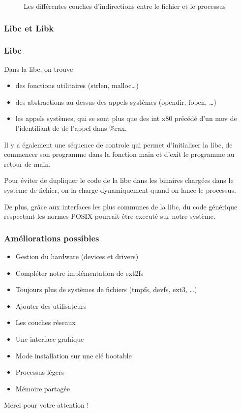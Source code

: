 \documentclass[10pt,a4paper]{beamer}
\begin{document}
\begin{frame}
  \begin{figure}
    \caption{Les différentes couches d'indirections entre le fichier et le processus}
  \end{figure}
\end{frame}

\begin{frame}
  \frametitle{Libc et Libk}

\end{frame}

\begin{frame}
  \frametitle{Libc}
  Dans la libc, on trouve
  \begin{itemize}
  \item des fonctions utilitaires (\textrm{strlen}, \textrm{malloc}\ldots)
  \item des abstractions au dessus des appels systèmes (\textrm{opendir}, \textrm{fopen}, \ldots)
  \item les appels systèmes, qui se sont plus que des \textrm{int x80} précédé d'un \textrm{mov} de l'identifiant de de l'appel dans \textrm{\%rax}.
  \end{itemize}

  Il y a également une séquence de controle qui permet d'initialiser la libc, de commencer son programme dans la fonction \textrm{main} et d'\textrm{exit} le programme au retour  de \textrm{main}.

  Pour éviter de dupliquer le code de la libc dans les binaires chargées dans le système de fichier, on la charge dynamiquement quand on lance le processus.

  De plus, grâce aux interfaces les plus communes de la libc, du code générique respectant les normes \textrm{POSIX} pourrait être executé sur notre système.

\end{frame}

\begin{frame}
  \frametitle{Améliorations possibles}
  \begin{itemize}
  \item Gestion du hardware (devices et drivers)
  \item Compléter notre implémentation de ext2fs
  \item Toujours plus de systèmes de fichiers (tmpfs, devfs, ext3, \ldots)
  \item Ajouter des utilisateurs
  \item Les couches réseaux
  \item Une interface grahique
  \item Mode installation sur une clé bootable
  \item Processus légers
  \item Mémoire partagée
  \end{itemize}

  \thinspace{}
  \begin{center}
    \large{Merci pour votre attention !}
  \end{center}

\end{frame}
\end{document}
